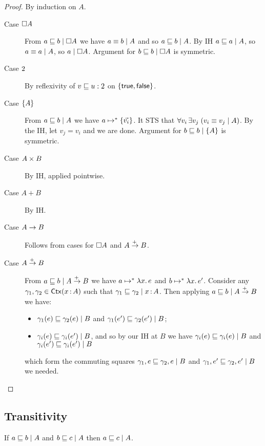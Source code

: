 \documentclass{article}
\begin{document}
\begin{proof}
  By induction on $A$.
  \begin{description}
  \item[Case $\disc{A}$] From $\lr{\disc{A}}{a \ale b}$ we have $\lr{A}{a \aeq
    b}$ and so $\lr{A}{a \ale b}$. By IH $\lr{A}{a \ale a}$, so $\lr{A}{a \aeq
    a}$, so $\lr{\disc{A}}{a}$. Argument for $\lr{\disc{A}}{b \ale b}$ is
    symmetric.

  \item[Case $\bool$] By reflexivity of $v \ale u : \bool$ on
    $\{\ms{true},\ms{false}\}$.

  \item[Case $\Set{A}$] From $\lr{A}{a \ale b}$ we have $a \steps
    \setlit{\vec{v_i}}$. It STS that $\forall v_i\, \exists v_j\; (\lr{A}{v_i
      \aeq v_j})$. By the IH, let $v_j = v_i$ and we are done. Argument for
    $\lr{\Set{A}}{b \ale b}$ is symmetric.

  \item[Case $A \x B$] By IH, applied pointwise. 
  \item[Case $A + B$] By IH. 
  \item[Case $A \uto B$] Follows from cases for $\disc{A}$ and $A \mto B$.

  \item[Case $A \mto B$] From $\lr{A \mto B}{a \ale b}$ we have $a \steps
    \fn\bind{x} e$ and $b \steps \fn\bind{x} e'$. Consider any $\gamma_1,
    \gamma_2 \in \ms{Ctx}(x \of A)$ such that $\lr{x\of A}{\gamma_1 \ale
      \gamma_2}$. Then applying $\lr{A \mto B}{a \ale b}$ we have:
    \begin{itemize}
    \item $\lr{B}{\gamma_1(e) \ale \gamma_2(e)}$ and $\lr{B}{\gamma_1(e') \ale
      \gamma_2(e')}$;
    \item $\lr{B}{\gamma_i(e) \ale \gamma_i(e')}$, and so by our IH at $B$ we
      have $\lr{B}{\gamma_i(e) \ale \gamma_i(e)}$ and $\lr{B}{\gamma_i(e') \ale
        \gamma_i(e')}$
    \end{itemize}
    which form the commuting squares $\commsq{B}{\gamma_1}{\gamma_2}{e}{e}$ and
    $\commsq{B}{\gamma_1}{\gamma_2}{e'}{e'}$ we needed.
  \end{description}
\end{proof}


\subsection{Transitivity}
\begin{theorem}[Transitivity]\label{thm:trans}
  If $\lr{A}{a \ale b}$ and $\lr{A}{b \ale c}$ then $\lr{A}{a \ale c}$.
\end{theorem}
\end{document}
